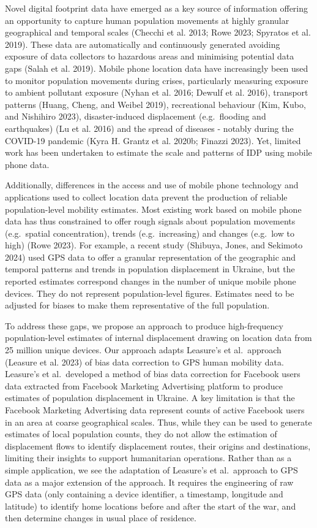 \documentclass[
  sn-nature,
  11pt,
]{sn-jnl}
\begin{document}
Novel digital footprint data have emerged as a key source of information
offering an opportunity to capture human population movements at highly
granular geographical and temporal scales (Checchi et al. 2013; Rowe
2023; Spyratos et al. 2019). These data are automatically and
continuously generated avoiding exposure of data collectors to hazardous
areas and minimising potential data gaps (Salah et al. 2019). Mobile
phone location data have increasingly been used to monitor population
movements during crises, particularly measuring exposure to ambient
pollutant exposure (Nyhan et al. 2016; Dewulf et al. 2016), transport
patterns (Huang, Cheng, and Weibel 2019), recreational behaviour (Kim,
Kubo, and Nishihiro 2023), disaster-induced displacement (e.g.~flooding
and earthquakes) (Lu et al. 2016) and the spread of diseases - notably
during the COVID-19 pandemic (Kyra H. Grantz et al. 2020b; Finazzi
2023). Yet, limited work has been undertaken to estimate the scale and
patterns of IDP using mobile phone data.

Additionally, differences in the access and use of mobile phone
technology and applications used to collect location data prevent the
production of reliable population-level mobility estimates. Most
existing work based on mobile phone data has thus constrained to offer
rough signals about population movements (e.g.~spatial concentration),
trends (e.g.~increasing) and changes (e.g.~low to high) (Rowe 2023). For
example, a recent study (Shibuya, Jones, and Sekimoto 2024) used GPS
data to offer a granular representation of the geographic and temporal
patterns and trends in population displacement in Ukraine, but the
reported estimates correspond changes in the number of unique mobile
phone devices. They do not represent population-level figures. Estimates
need to be adjusted for biases to make them representative of the full
population.

To address these gaps, we propose an approach to produce high-frequency
population-level estimates of internal displacement drawing on location
data from 25 million unique devices. Our approach adapts Leasure's et
al.~approach (Leasure et al. 2023) of bias data correction to GPS human
mobility data. Leasure's et al.~developed a method of bias data
correction for Facebook users data extracted from Facebook Marketing
Advertising platform to produce estimates of population displacement in
Ukraine. A key limitation is that the Facebook Marketing Advertising
data represent counts of active Facebook users in an area at coarse
geographical scales. Thus, while they can be used to generate estimates
of local population counts, they do not allow the estimation of
displacement flows to identify displacement routes, their origins and
destinations, limiting their insights to support humanitarian
operations. Rather than as a simple application, we see the adaptation
of Leasure's et al.~approach to GPS data as a major extension of the
approach. It requires the engineering of raw GPS data (only containing a
device identifier, a timestamp, longitude and latitude) to identify home
locations before and after the start of the war, and then determine
changes in usual place of residence.
\end{document}
